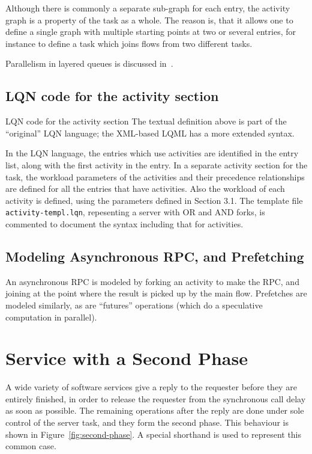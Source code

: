 \documentclass[11pt]{article}
\begin{document}
Although there is commonly a separate sub-graph for each entry, the activity graph is a
property of the task as a whole. The reason is, that it allows one to define a single graph with
multiple starting points at two or several entries, for instance to define a task which joins flows from
two different tasks. 

Parallelism in layered queues is discussed in~\cite{WOSP98:franks-98}.

\subsection{LQN code for the activity section}
\label{sec:activities-code}

LQN code for the activity section The textual definition above is part of the ``original'' LQN language; the XML-based LQML
has a more extended syntax.

In the LQN language, the entries which use activities are identified in the entry list, along
with the first activity in the entry. In a separate activity section for the task, the workload
parameters of the activities and their precedence relationships are defined for all the entries that
have activities. Also the workload of each activity is defined, using the parameters defined in
Section 3.1. The template file \texttt{activity-templ.lqn}, repesenting a server with OR and AND
forks, is commented to document the 
syntax including that for activities.

\subsection{Modeling Asynchronous RPC, and Prefetching}
\label{sec:asynch-rpc}


An asynchronous RPC is modeled by forking an 
activity to make the RPC, and joining at the point where the result is picked up by the main flow.
Prefetches are modeled similarly, as are ``futures'' operations (which do a speculative computation
in parallel). 

\section{Service with a Second Phase}
\label{sec:second-phase}

A wide variety of software services give a reply to the requester
before they are entirely finished, in order to release the requester
from the synchronous call delay as soon as possible. The remaining
operations after the reply are done under sole control of the server
task, and they form the second phase. This behaviour is shown in
Figure~\ref{fig:second-phase}.  A special shorthand is used to
represent this common case.
\end{document}
